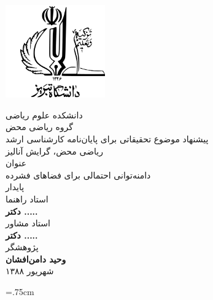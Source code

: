 \documentclass[12pt,a4paper]{article}
\theoremstyle{definition}
\theoremstyle{theorem}
\theoremstyle{definition}
\begin{document}
\thispagestyle{empty}
\vspace*{-28mm}
\centerline{\includegraphics[height=4cm]{logo.jpg}}
\begin{center}
\vspace{-2mm}

دانشکده علوم ریاضی
\\[.1cm]

گروه ریاضی محض
\\[.7cm]
{\large
پیشنهاد موضوع تحقیقاتی برای پایان‌نامه کارشناسی ارشد
\\[.2cm]
ریاضی محض، گرایش آنالیز
\\[.7cm]
عنوان
\\[.4cm]
}
{\Huge \yekan
دامنه‌توانی احتمالی برای فضاهای فشرده 
\\[.4cm]
پایدار 
}
\\[1.3cm]
{\traffic \large
استاد راهنما
}
\\[.4cm]
\textbf{\large {\nastaliq دکتر .....}}
\\[.8cm]


{\traffic \large
استاد مشاور
}
\\[.4cm]
\textbf{\large {\nastaliq دکتر .....}}
\\[.7cm]
{\traffic \large
 پژوهشگر
}
\\[.5cm]
\textbf{\large {\nastaliq وحید دامن‌افشان}}
\\[.4cm]
{\large
شهریور ۱۳۸۸
}
\end{center}
\newpage
\baselineskip=1cm
\tableofcontents

\baselineskip=.75cm
\newpage 
\end{document}
